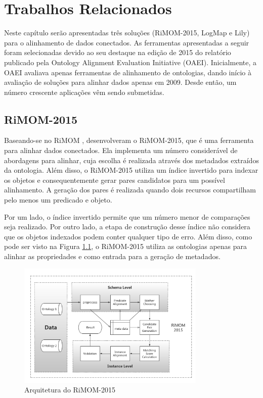 \chapter{Trabalhos Relacionados}

Neste capítulo serão apresentadas três soluções (RiMOM-2015, LogMap e Lily) para o alinhamento de dados conectados. As ferramentas apresentadas a seguir foram selecionadas devido ao seu destaque na edição de 2015 do relatório publicado pela Ontology Alignment Evaluation Initiative (OAEI). Inicialmente, a OAEI avaliava apenas ferramentas de alinhamento de ontologias, dando início à avaliação de soluções para alinhar dados apenas em 2009. Desde então, um número crescente aplicações vêm sendo submetidas.

\section{RiMOM-2015}
Baseando-se no RiMOM \cite{li2009rimom},  desenvolveram o RiMOM-2015, que é uma ferramenta para alinhar dados conectados. Ela implementa um número considerável de abordagens para alinhar, cuja escolha é realizada através dos metadados extraídos da ontologia. Além disso, o RiMOM-2015 utiliza um índice invertido para indexar os objetos e consequentemente gerar pares candidatos para um possível alinhamento. A geração dos pares é realizada quando dois recursos compartilham pelo menos um predicado e objeto.

Por um lado, o índice invertido permite que um número menor de comparações seja realizado. Por outro lado, a etapa de 
construção desse índice não considera que os objetos indexados podem conter qualquer tipo de erro. Além disso, como pode ser visto na Figura \ref{fig:rimom}, o RiMOM-2015 utiliza as ontologias apenas para alinhar as propriedades e como entrada para a geração de metadados.

\begin{figure}[!ht]
	\centering
	\includegraphics[width=0.8\textwidth]{./imagens/RiMOM_2015.png}
    \caption{Arquitetura do RiMOM-2015}
	\label{fig:rimom}
\end{figure}

